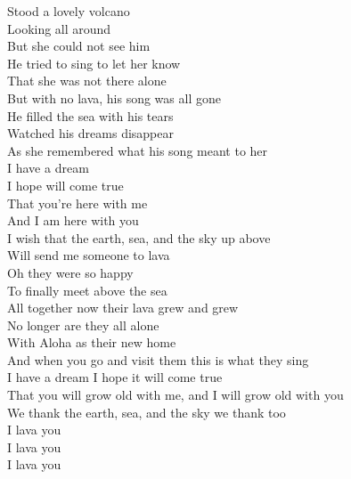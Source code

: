 Stood a lovely volcano\\
Looking all around\\
But she could not see him\\
He tried to sing to let her know\\
That she was not there alone\\
But with no lava, his song was all gone\\
He filled the sea with his tears\\
Watched his dreams disappear\\
As she remembered what his song meant to her\\
\hops
{} I have a dream\\
 I hope will come true\\
 That you're here with me\\
 And I am here with you\\
 I wish that the earth, sea, and the sky up above\\
 Will send me someone to lava\\
\hops
Oh they were so happy\\
To finally meet above the sea\\
All together now their lava grew and grew\\
No longer are they all alone\\
With Aloha as their new home\\
And when you go and visit them this is what they sing\\
\hops
{} I have a dream I hope it will come true\\
 That you will grow old with me, and I will grow old with you\\
 We thank the earth, sea, and the sky we thank too\\
 I lava you\\
 I lava you\\
 I lava you